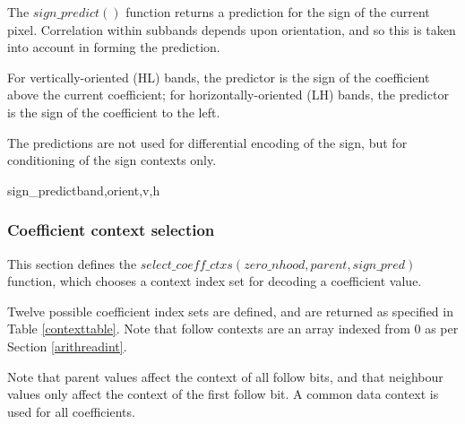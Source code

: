 The $sign\_predict()$ function returns a prediction for the sign of the 
current pixel. Correlation within subbands depends upon orientation,
and so this is taken into account in forming the prediction.

For vertically-oriented (HL) bands, the predictor is the sign of the
coefficient above the current coefficient; for horizontally-oriented (LH)
bands, the predictor is the sign of the coefficient to the left. 

The predictions are not used for differential encoding of the sign, but for
conditioning of the sign contexts only.

\begin{pseudo}{sign\_predict}{band,orient,v,h}
  \bsELSE
  \bsEND
{}
  \bsELSE
  \bsEND
\bsELSE
\bsEND{}
\end{pseudo}

\subsubsection{Coefficient context selection}
\label{selectcoeffcontext}

This section defines the $select\_coeff\_ctxs(zero\_nhood, parent, sign\_pred)$
function, which chooses a context index set for decoding a coefficient value.

Twelve possible coefficient index sets are defined, and are returned as specified 
in Table \ref{contexttable}. Note that follow contexts are an array indexed from $0$
as per Section \ref{arithreadint}.

Note that parent values affect the context of all follow bits, and that neighbour
values only affect the context of the first follow bit. A common data context is used
for all coefficients.

